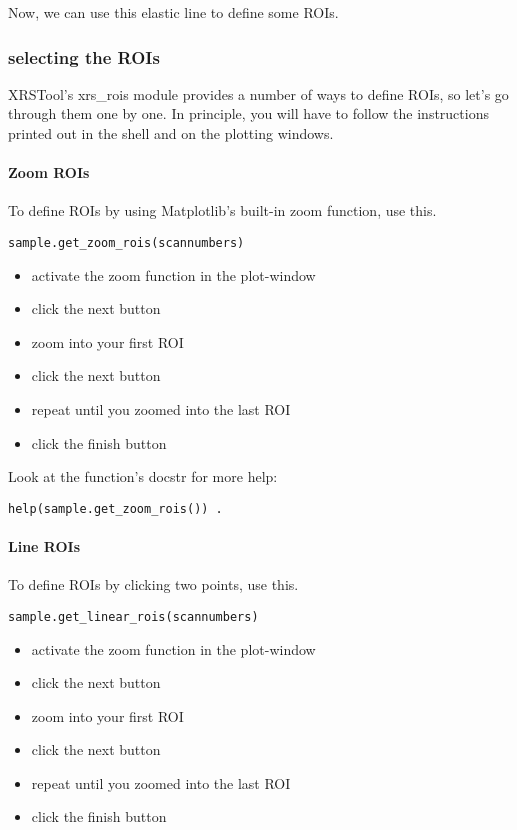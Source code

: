 \documentclass[aps,prl,groupedaddress]{revtex4}
\begin{document}
Now, we can use this elastic line to define some ROIs.

\subsubsection{selecting the ROIs}
XRSTool's xrs\_rois module provides a number of ways to define ROIs, so let's go through them one by one. In principle, you will have to follow the instructions printed out in the shell and on the plotting windows.

\paragraph{Zoom ROIs}
To define ROIs by using Matplotlib's built-in zoom function, use this.
\begin{lstlisting}[frame=single]
sample.get_zoom_rois(scannumbers)
\end{lstlisting}

\begin{itemize}
 \item activate the zoom function in the plot-window
 \item click the next button
 \item zoom into your first ROI
 \item click the next button
 \item repeat until you zoomed into the last ROI
 \item click the finish button
\end{itemize}

Look at the function's docstr for more help:
\begin{lstlisting}[frame=single]
help(sample.get_zoom_rois()) .
\end{lstlisting}

\paragraph{Line ROIs}
To define ROIs by clicking two points, use this.
\begin{lstlisting}[frame=single]
sample.get_linear_rois(scannumbers)
\end{lstlisting}

\begin{itemize}
 \item activate the zoom function in the plot-window
 \item click the next button
 \item zoom into your first ROI
 \item click the next button
 \item repeat until you zoomed into the last ROI
 \item click the finish button
\end{itemize}
\end{document}
